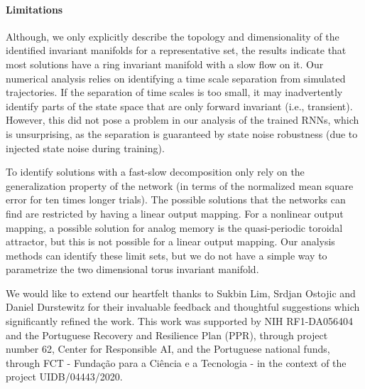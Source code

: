 \documentclass{article} %
\newcounter{ct}
\theoremstyle{definition}
\theoremstyle{remark}
\begin{document}
\paragraph{Limitations}
Although, we only explicitly describe the topology and dimensionality of the identified invariant manifolds for a representative set, the results indicate that most solutions have a ring invariant manifold with a slow flow on it.
Our numerical analysis relies on identifying a time scale separation from simulated trajectories. If the separation of time scales is too small, it may inadvertently identify parts of the state space that are only forward invariant (i.e., transient). However, this did not pose a problem in our analysis of the trained RNNs, which is unsurprising, as the separation is guaranteed by state noise robustness (due to injected state noise during training).

To identify solutions with a fast-slow decomposition only rely on the generalization property of the network (in terms of the normalized mean square error for ten times longer trials).
The possible solutions that the networks can find are restricted by having a linear output mapping.
For a nonlinear output mapping, a possible solution for analog memory is the quasi-periodic toroidal attractor, but this is not possible for a linear output mapping.
Our analysis methods can identify these limit sets, but we do not have a simple way to parametrize the two dimensional torus invariant manifold.







\begin{ack}
We would like to extend our heartfelt thanks to Sukbin Lim, Srdjan Ostojic and Daniel Durstewitz for their invaluable feedback and thoughtful suggestions which significantly refined the work.
This work was supported by NIH RF1-DA056404 and the Portuguese Recovery and Resilience Plan (PPR), through project number 62, Center for Responsible AI, and the Portuguese national funds, through FCT - Funda\c{c}\~{a}o para a Ci\^{e}ncia e a Tecnologia - in the context of the project UIDB/04443/2020.
\end{ack}


\end{document}
